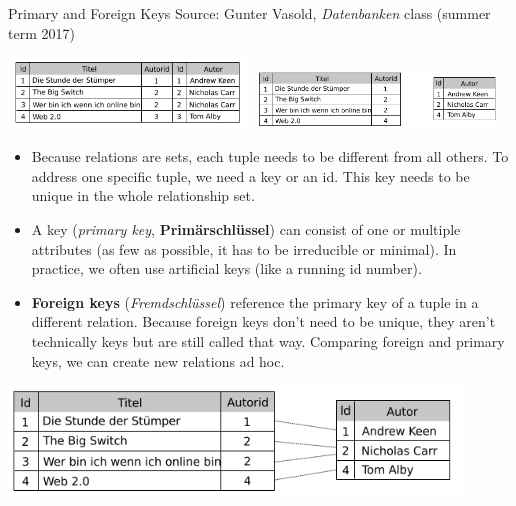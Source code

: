 \begin{frame}[allowframebreaks]{Primary and Foreign Keys}
{\scriptsize Source: Gunter Vasold, \emph{Datenbanken} class (summer term 2017)}

      \begin{block}{}
      \centering \includegraphics[width=0.48\textwidth]{img/autor-id-titel.png}~\includegraphics[width=0.48\textwidth]{img/foreign-key.png}
      \end{block}

\begin{itemize}\scriptsize
\item Because relations are sets, each tuple needs to be different from all others. To address one specific tuple, we need a key or an id. This key needs to be unique in the whole relationship set. 
\item A key (\emph{primary key}, \textbf{Primärschlüssel}) can consist of one or multiple attributes (as few as possible, it has to be irreducible or minimal). In practice, we often use artificial keys (like a running id number). 
\item \textbf{Foreign keys} (\emph{Fremdschlüssel}) reference the primary key of a tuple in a different relation. Because foreign keys don't need to be unique, they aren't technically keys but are still called that way. Comparing foreign and primary keys, we can create new relations ad hoc.
\end{itemize} 

\framebreak

\includegraphics[width=0.9\textwidth]{img/foreign-keys-linked.png}\bigskip


\end{frame}

